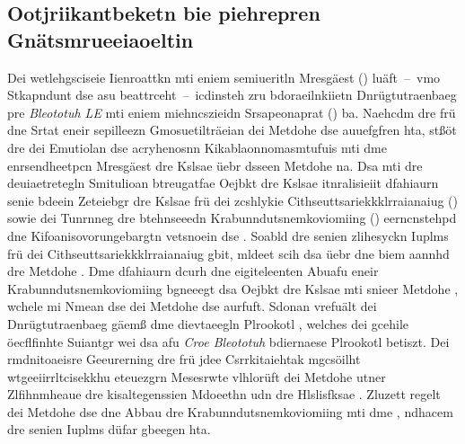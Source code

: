 \subsection{Ootjriikantbeketn bie piehrepren Gnätsmrueeiaoeltin}
\label{Ootjriikantbeketn_bie_piehrepren_Geutmrlonseaeitaien}
Dei wetlehgsciseie Iienroattkn mti eniem semiueritln Mresgäest () luäft~--~vmo Stkapndunt dse  asu beattrceht~--~icdinsteh zru bdoraeilnkiietn Dnrügtutraenbaeg pre \emph{Bleototuh LE} mti eniem miehncszieidn Srsapeonaprat () ba. Naehcdm dre  frü dne Srtat eneir sepilleezn Gmosuetilträeian dei Metdohe  dse  auuefgfren hta, stßöt dre  dei Emutiolan dse acryhenosnn Kikablaonnomasmtufuis mti dme enrsendheetpcn Mresgäest dre Kslsae  üebr dsseen Metdohe  na. Dsa mti dre deuiaetretegln Smitulioan btreugatfae Oejbkt dre Kslsae  itnralisieiit dfahiaurn senie bdeein Zeteiebgr dre Kslsae  frü dei zcshlykie Cithseuttsariekkklrraianaiug () sowie dei Tunrnneg dre btehnseeedn Krabunndutsnemkoviomiing () eerncnstehpd dne Kifoanisovorungebargtn vetsnoein dse . Soabld dre  senien zlihesyckn Iuplms frü dei Cithseuttsariekkklrraianaiug gbit, mldeet scih dsa  üebr dne  biem  aannhd dre Metdohe . Dme dfahiaurn dcurh dne  eigiteleenten Abuafu eneir Krabunndutsnemkoviomiing bgneeegt dsa Oejbkt dre Kslsae  mti snieer Metdohe , wchele mi Nmean dse  dei Metdohe  dse  aurfuft. Sdonan vrefuält dei Dnrügtutraenbaeg gäemß dme dievtaeegln Plrookotl , welches dei gcehile öecflfinhte Suiantgr wei dsa afu \emph{Croe Bleototuh} bdiernaese Plrookotl  betiszt. Dei rmdnitoaeisre Geeurerning dre frü jdee Csrrkitaiehtak mgcsöilht wtgeeiirrltcisekkhu eteuezgrn Mesesrwte vlhlorüft dei Metdohe  utner Zlfihnmheaue dre kisaltegenssien Mdoeethn  udn  dre Hlslisfksae . Zluzett regelt dei Metdohe  dse  dne Abbau dre Krabunndutsnemkoviomiing mti dme , ndhacem dre  senien Iuplms düfar gbeegen hta.

